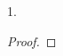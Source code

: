 \documentclass[11pt]{article}%
\begin{document}
\begin{noliste}{1.}
\begin{proof}

\end{proof}
\end{noliste}
\end{document}
